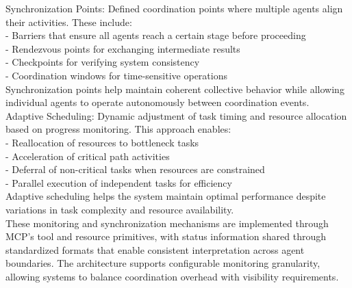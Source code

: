 Synchronization Points: Defined coordination points where multiple agents align their activities. These include:\\ \newline
- Barriers that ensure all agents reach a certain stage before proceeding\\ \newline
- Rendezvous points for exchanging intermediate results\\ \newline
- Checkpoints for verifying system consistency\\ \newline
- Coordination windows for time-sensitive operations\\ \newline
Synchronization points help maintain coherent collective behavior while allowing individual agents to operate autonomously between coordination events.\\ \newline
Adaptive Scheduling: Dynamic adjustment of task timing and resource allocation based on progress monitoring. This approach enables:\\ \newline
- Reallocation of resources to bottleneck tasks\\ \newline
- Acceleration of critical path activities\\ \newline
- Deferral of non-critical tasks when resources are constrained\\ \newline
- Parallel execution of independent tasks for efficiency\\ \newline
Adaptive scheduling helps the system maintain optimal performance despite variations in task complexity and resource availability.\\ \newline
These monitoring and synchronization mechanisms are implemented through MCP's tool and resource primitives, with status information shared through standardized formats that enable consistent interpretation across agent boundaries. The architecture supports configurable monitoring granularity, allowing systems to balance coordination overhead with visibility requirements.\\
